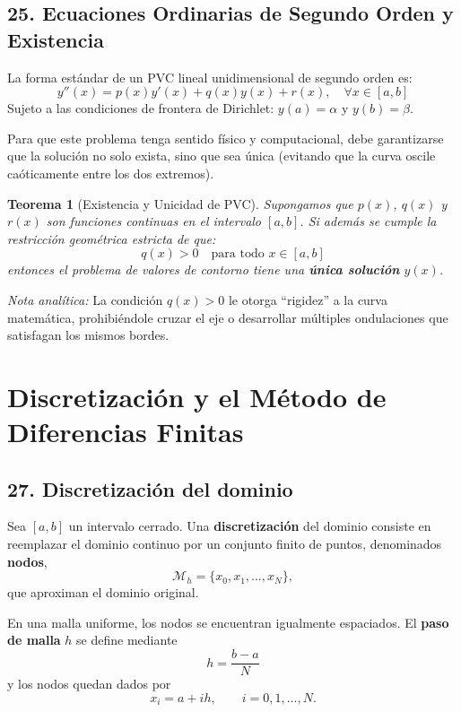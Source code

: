 \documentclass[12pt]{article}
\newtheorem{teorema}{Teorema}
\begin{document}
\subsection*{25. Ecuaciones Ordinarias de Segundo Orden y Existencia}

La forma estándar de un PVC lineal unidimensional de segundo orden es:
\begin{equation}
    y''(x) = p(x)y'(x) + q(x)y(x) + r(x), \quad \forall x \in [a, b]
\end{equation}
Sujeto a las condiciones de frontera de Dirichlet: $y(a) = \alpha$ y $y(b) = \beta$.

Para que este problema tenga sentido físico y computacional, debe garantizarse que la solución no solo exista, sino que sea única (evitando que la curva oscile caóticamente entre los dos extremos).

\begin{teorema}[Existencia y Unicidad de PVC]
Supongamos que $p(x)$, $q(x)$ y $r(x)$ son funciones continuas en el intervalo $[a, b]$. Si además se cumple la restricción geométrica estricta de que:
\begin{equation}
    q(x) > 0 \quad \text{para todo } x \in [a, b]
\end{equation}
entonces el problema de valores de contorno tiene una \textbf{única solución} $y(x)$.
\end{teorema}
\textit{Nota analítica:} La condición $q(x) > 0$ le otorga ``rigidez'' a la curva matemática, prohibiéndole cruzar el eje o desarrollar múltiples ondulaciones que satisfagan los mismos bordes.


\section*{Discretización y el Método de Diferencias Finitas}

\subsection*{27. Discretización del dominio}

\begin{definition}
Sea $[a,b]$ un intervalo cerrado. Una \textbf{discretización} del dominio
consiste en reemplazar el dominio continuo por un conjunto finito de puntos,
denominados \textbf{nodos},
\[
\mathcal{M}_h=\{x_0,x_1,\ldots,x_N\},
\]
que aproximan el dominio original.
\end{definition}

En una malla uniforme, los nodos se encuentran igualmente espaciados. El
\textbf{paso de malla} $h$ se define mediante
\[
\boxed{
h=\frac{b-a}{N}
}
\tag{24}
\]
y los nodos quedan dados por
\[
\boxed{
x_i=a+ih,
\qquad i=0,1,\ldots,N.
}
\]
\end{document}
